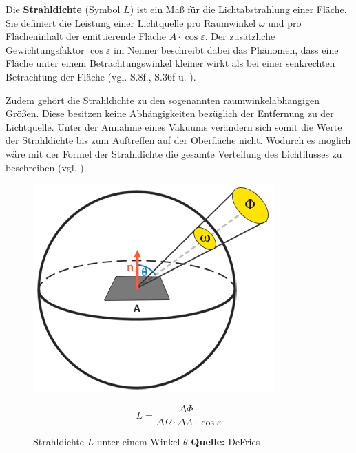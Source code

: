 \documentclass[
  11pt,
  a4paper,
  oneside
  ]{article}
\begin{document}
Die \textbf{Strahldichte} (Symbol $L$) ist ein Maß für die Lichtabstrahlung einer Fläche. Sie definiert die Leistung einer Lichtquelle pro Raumwinkel $\omega$ und pro Flächeninhalt der emittierende Fläche $A\cdot \cos \varepsilon$. Der zusätzliche Gewichtungsfaktor $\cos \varepsilon$ im Nenner beschreibt dabei das Phänomen, dass eine Fläche unter einem Betrachtungswinkel kleiner wirkt als bei einer senkrechten Betrachtung der Fläche 
(vgl. S.8f.\cite{GrundlagenLichtTechnik}, S.36f \cite{radiometrischeGrundbegriffe} u. \cite{vgb,learnOpenGL}).

Zudem gehört die Strahldichte zu den sogenannten raumwinkelabhängigen Größen. Diese besitzen keine Abhängigkeiten bezüglich der Entfernung zu der Lichtquelle. Unter der Annahme eines Vakuums verändern sich somit die Werte der Strahldichte bis zum Auftreffen auf der Oberfläche nicht. Wodurch es möglich wäre mit der Formel der Strahldichte die gesamte Verteilung des Lichtflusses zu beschreiben
(vgl. \cite{gMueller}). 
\begin{figure}[H]
  \centering
  \begin{minipage}{.5\textwidth}
    \centering
    \includegraphics*[width=0.7 \linewidth]{images/radiance.png}
    \caption{Strahldichte $L$ unter einem Winkel $\theta$ \footnotesize\textbf{Quelle:} DeFries\cite{learnOpenGL}}
    \label{fig:img4}
  \end{minipage}%
  \hfill
  \begin{minipage}{.5\textwidth}
    \begin{equation}
      L=\dfrac{\Delta \Phi \cdot }{\Delta \Omega \cdot \Delta A\cdot \cos \varepsilon } 
    \end{equation}
  \end{minipage}
\end{figure}
\end{document}
